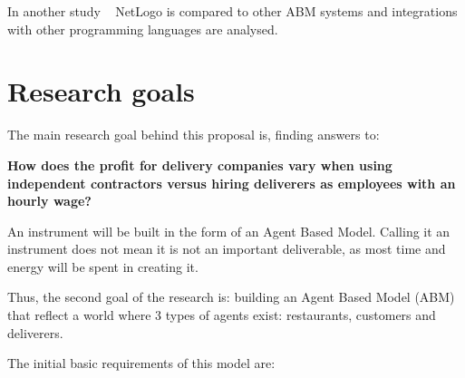 \documentclass{article}
\begin{document}
    In another study ~\cite{antelmi2024reliable} NetLogo is compared to other ABM systems and integrations with other programming languages are analysed.


    \section{Research goals}
    The main research goal behind this proposal is, finding answers to:

    \textbf{How does the profit for delivery companies vary when using independent contractors versus hiring deliverers as employees with an hourly wage? }

    An instrument will be built in the form of an Agent Based Model.
    Calling it an instrument does not mean it is not an important deliverable, as most time and energy will be spent in creating it.

    Thus, the second goal of the research is: building an Agent Based Model (ABM) that reflect a world where 3 types of agents exist: restaurants, customers and deliverers.

    The initial basic requirements of this model are:
\end{document}
